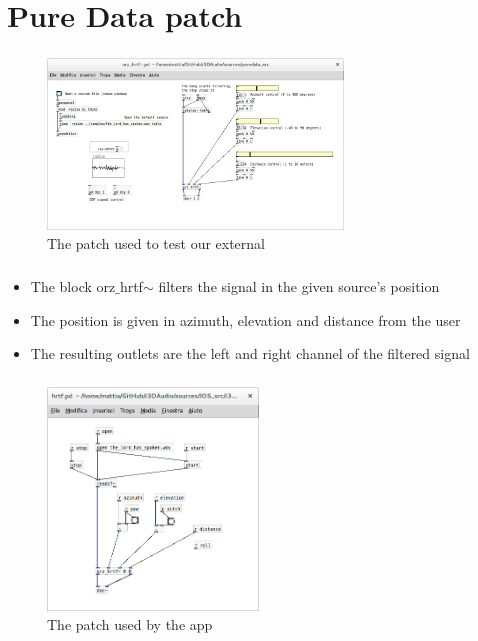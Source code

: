 \documentclass{beamer}
\begin{document}
	\section{Pure Data patch}

	\begin{frame}
		\frametitle{\insertsection}
		\begin{figure}
			\centering
			  \includegraphics[width=0.7\textwidth]{images/Test_patch.png}
			  \caption{The patch used to test our external}
			  \label{fig:test}
		\end{figure}
	\end{frame}
	
	\begin{frame}
		\frametitle{\insertsection}
		\begin{itemize}
			\item The block orz$\_$hrtf$\sim$ filters the signal in the given source's position
			\item The position is given in azimuth, elevation and distance from the user
			\item The resulting outlets are the left and right channel of the filtered signal
		\end{itemize}
	\end{frame}

	\begin{frame}
		\frametitle{\insertsection}
		\begin{figure}
			\centering
			  \includegraphics[width=0.5\textwidth]{images/iOS_patch.png}
			  \caption{The patch used by the app}
			  \label{fig:ios_pd}
		\end{figure}
	\end{frame}
\end{document}
